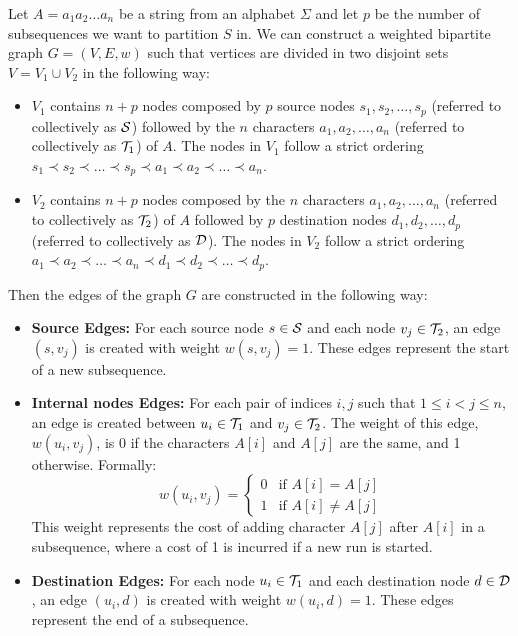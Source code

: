 \begin{definition} \label{def:bip_construction}
    Let $A=a_1a_2\dots a_n$ be a string from an alphabet $\Sigma$ and let $p$ be the number of subsequences we want to partition $S$ in. 
    We can construct a weighted bipartite graph $G = (V,E,w)$ such that vertices are divided in two disjoint sets $V = V_1 \cup V_2$ in the following way:
    \begin{itemize}[leftmargin=25pt]
        \item $V_1$ contains $n+p$ nodes composed by $p$ source nodes $s_1,s_2,\dots,s_p$ (referred to collectively as $\mathcal{S}$) followed by the $n$ characters $a_1,a_2,\dots,a_n$ (referred to collectively as $\mathcal{T}_{1}$) of $A$. The nodes in $V_1$ follow a strict ordering $s_1 \prec s_2 \prec \dots \prec s_p \prec a_1 \prec a_2 \prec \dots \prec a_n$.
        \item $V_2$ contains $n+p$ nodes composed by the $n$ characters $a_1,a_2,\dots,a_n$ (referred to collectively as $\mathcal{T}_{2}$) of $A$ followed by $p$ destination nodes $d_1,d_2,\dots,d_p$ (referred to collectively as $\mathcal{D}$). The nodes in $V_2$ follow a strict ordering $a_1 \prec a_2 \prec \dots \prec a_n \prec d_1 \prec d_2 \prec \dots \prec d_p$.
    \end{itemize}
    Then the edges of the graph $G$ are constructed in the following way:
    \begin{itemize}[leftmargin=25pt]
        \item \textbf{Source Edges:} For each source node $s \in \mathcal{S}$ and each node $v_j \in \mathcal{T}_{2}$, an edge $(s, v_j)$ is created with weight $w(s, v_j) = 1$. These edges represent the start of a new subsequence.

        \item \textbf{Internal nodes Edges:} For each pair of indices $i, j$ such that $1 \le i < j \le n$, an edge is created between $u_i \in \mathcal{T}_{1}$ and $v_j \in \mathcal{T}_{2}$. The weight of this edge, $w(u_i, v_j)$, is 0 if the characters $A[i]$ and $A[j]$ are the same, and 1 otherwise. Formally:
        \[ w(u_i, v_j) = 
            \begin{cases} 
                0 & \text{if } A[i] = A[j] \\
                1 & \text{if } A[i] \neq A[j] 
            \end{cases}
        \]
        This weight represents the cost of adding character $A[j]$ after $A[i]$ in a subsequence, where a cost of 1 is incurred if a new run is started.

        \item \textbf{Destination Edges:} For each node $u_i \in \mathcal{T}_{1}$ and each destination node $d \in \mathcal{D}$, an edge $(u_i, d)$ is created with weight $w(u_i, d) = 1$. These edges represent the end of a subsequence.
    \end{itemize}
\end{definition}

